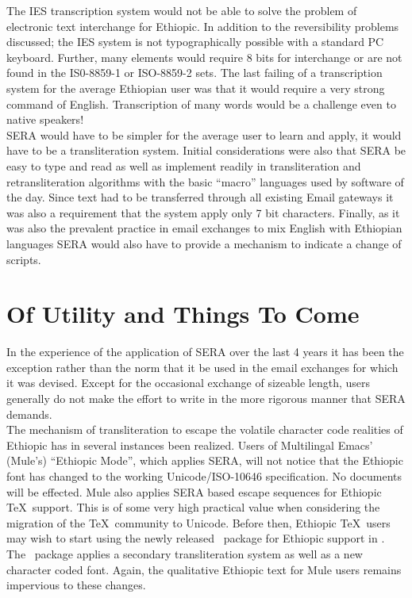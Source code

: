 The IES transcription system would not be able to solve the problem of
electronic text interchange for Ethiopic.  In addition to the reversibility
problems discussed; the IES system is not typographically possible with a
standard PC keyboard.  Further, many elements would require
8 bits for interchange or are not found in the IS0-8859-1 or ISO-8859-2 sets.
The last failing of a transcription system for the average Ethiopian user was
that it would require a very strong command of English.  Transcription of many
words would be a challenge even to native speakers!\\
SERA would have to be simpler for the average user to learn and apply, it would 
have to be a transliteration system.  Initial considerations were also that
SERA be easy to type and read as well as implement readily in transliteration
and retransliteration algorithms with the basic ``macro'' languages used by
software of the day.  Since text had to be transferred through all existing
Email gateways it was also a requirement that the system apply only 7 bit
characters.  Finally, as it was also the prevalent practice in email exchanges
to mix English with Ethiopian languages SERA would also have to provide a
mechanism to indicate a change of scripts.\\


\section*{Of Utility and Things To Come}

In the experience of the application of SERA over the last 4 years it has been
the exception rather than the norm that it be used in the email exchanges for
which it was devised.  Except for the occasional exchange of sizeable length,
users generally do not make the effort to write in the more rigorous manner that
SERA demands.\\

The mechanism of transliteration to escape the volatile character code
realities of Ethiopic has in several instances been realized.  Users of
Multilingal Emacs' (Mule's) ``Ethiopic Mode'', which applies SERA, will not
notice that the Ethiopic font has changed to the working Unicode/ISO-10646
specification.  No documents will be effected.  Mule also applies SERA based
escape sequences for Ethiopic \TeX~support.  This is of some very high
practical value when considering the migration of the \TeX ~community to Unicode.
%
%
Before then, Ethiopic \TeX ~users may wish to start using the newly released
\ethioplogo~package for Ethiopic support in \Babel.  The \ethioplogo~package
applies a secondary transliteration system as well as a new character coded 
font.  Again, the qualitative Ethiopic text for Mule users remains impervious
to these changes.\\

